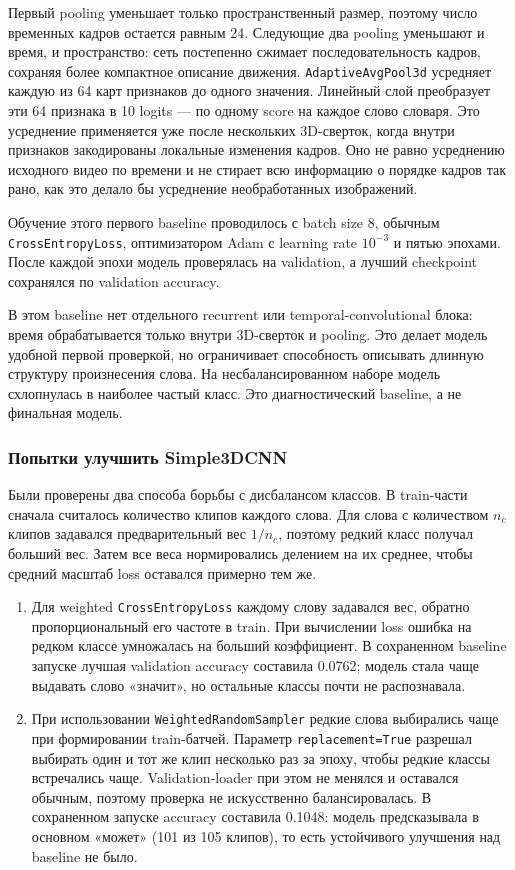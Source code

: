 \documentclass[12pt,a4paper]{article}
\begin{document}
Первый pooling уменьшает только пространственный размер, поэтому число
временных кадров остается равным 24. Следующие два pooling уменьшают и
время, и пространство: сеть постепенно сжимает последовательность кадров,
сохраняя более компактное описание движения. \texttt{AdaptiveAvgPool3d}
усредняет каждую из 64 карт признаков до одного значения. Линейный слой
преобразует эти 64 признака в 10 logits --- по одному score на каждое слово
словаря. Это усреднение применяется уже после нескольких 3D-сверток, когда
внутри признаков закодированы локальные изменения кадров. Оно не равно
усреднению исходного видео по времени и не стирает всю информацию о порядке
кадров так рано, как это делало бы усреднение необработанных изображений.

Обучение этого первого baseline проводилось с batch size 8, обычным
\texttt{CrossEntropyLoss}, оптимизатором Adam с learning rate $10^{-3}$ и
пятью эпохами. После каждой эпохи модель проверялась на validation, а лучший
checkpoint сохранялся по validation accuracy.

В этом baseline нет отдельного recurrent или temporal-convolutional блока:
время обрабатывается только внутри 3D-сверток и pooling. Это делает модель
удобной первой проверкой, но ограничивает способность описывать длинную
структуру произнесения слова. На несбалансированном наборе модель
схлопнулась в наиболее частый класс. Это диагностический baseline, а не
финальная модель.

\subsubsection{Попытки улучшить Simple3DCNN}

Были проверены два способа борьбы с дисбалансом классов. В train-части
сначала считалось количество клипов каждого слова. Для слова с количеством
$n_c$ клипов задавался предварительный вес $1/n_c$, поэтому редкий класс
получал больший вес. Затем все веса нормировались делением на их среднее,
чтобы средний масштаб loss оставался примерно тем же.

\begin{enumerate}
\item Для weighted \texttt{CrossEntropyLoss} каждому слову задавался вес,
обратно пропорциональный его частоте в train. При вычислении loss ошибка на
редком классе умножалась на больший коэффициент. В сохраненном baseline
запуске лучшая validation accuracy составила 0.0762; модель стала чаще
выдавать слово «значит», но остальные классы почти не распознавала.
\item При использовании \texttt{WeightedRandomSampler} редкие слова
выбирались чаще при формировании train-батчей. Параметр
\texttt{replacement=True} разрешал выбирать один и тот же клип несколько
раз за эпоху, чтобы редкие классы встречались чаще. Validation-loader при
этом не менялся и оставался обычным, поэтому проверка не искусственно
балансировалась. В сохраненном запуске accuracy составила 0.1048: модель
предсказывала в основном «может» (101 из 105 клипов), то есть устойчивого
улучшения над baseline не было.
\end{enumerate}
\end{document}
